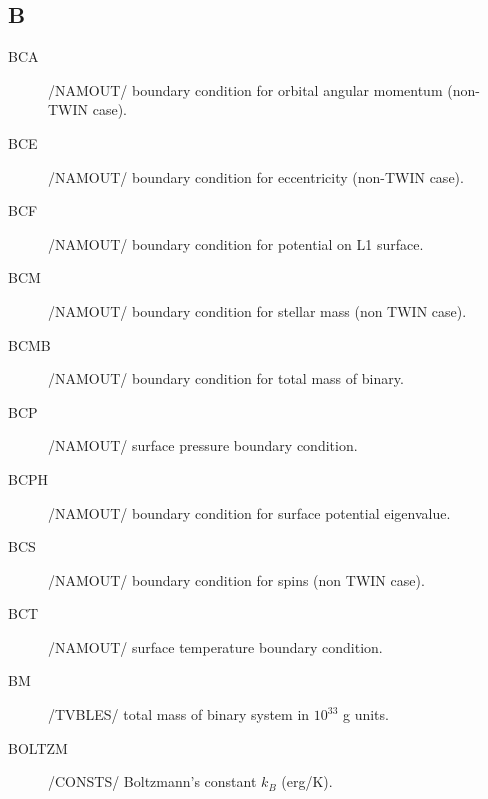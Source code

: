 \documentclass{article}
\begin{document}
\subsection*{B}
\begin{description}
	\item[BCA]		    /NAMOUT/ boundary condition for orbital angular momentum (non-TWIN case).
	
	\item[BCE]		    /NAMOUT/ boundary condition for eccentricity (non-TWIN case).

	\item[BCF]		    /NAMOUT/ boundary condition for potential on L1 surface.

	\item[BCM]		    /NAMOUT/ boundary condition for stellar mass (non TWIN case).

	\item[BCMB]    	/NAMOUT/ boundary condition for total mass of binary.

	\item[BCP]		    /NAMOUT/ surface pressure boundary condition.

	\item[BCPH]		/NAMOUT/ boundary condition for surface potential eigenvalue.

	\item[BCS]		    /NAMOUT/ boundary condition for spins (non TWIN case).
	
	\item[BCT]		    /NAMOUT/ surface temperature boundary condition.
	
	\item[BM]      	/TVBLES/ total mass of binary system in $10^{33}$ g units.
	
	\item[BOLTZM]		/CONSTS/ Boltzmann's constant $k_B$ (erg/K).
	

\end{description}
\end{document}
